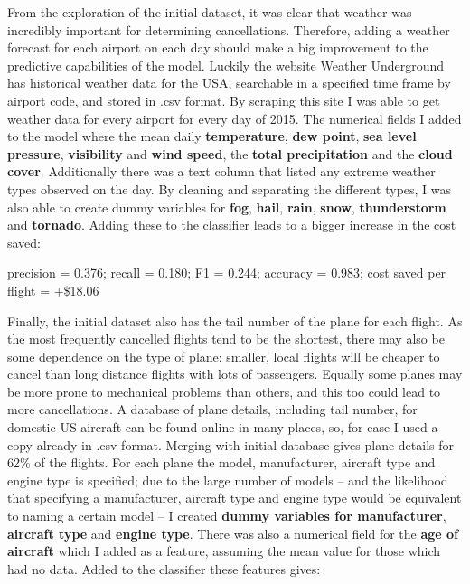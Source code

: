 \documentclass[a4paper]{article}
\begin{document}
From the exploration of the initial dataset, it was clear that weather was incredibly important for determining cancellations. Therefore, adding a weather forecast for each airport on each day should make a big improvement to the predictive capabilities of the model. Luckily the website Weather Underground\footnotemark[17] has historical weather data for the USA, searchable in a specified time frame by airport code, and stored in .csv format. By scraping this site I was able to get weather data for every airport for every day of 2015. The numerical fields I added to the model where the mean daily {\bf temperature}, {\bf dew point}, {\bf sea level pressure}, {\bf visibility} and {\bf wind speed}, the {\bf total precipitation} and the {\bf cloud cover}. Additionally there was a text column that listed any extreme weather types observed on the day. By cleaning and separating the different types, I was also able to create dummy variables for {\bf fog}, {\bf hail}, {\bf rain}, {\bf snow}, {\bf thunderstorm} and {\bf tornado}. Adding these to the classifier leads to a bigger increase in the cost saved:

\noindent precision = 0.376; recall = 0.180; F1 = 0.244; accuracy = 0.983; cost saved per flight = +\$18.06

Finally, the initial dataset also has the tail number of the plane for each flight. As the most frequently cancelled flights tend to be the shortest, there may also be some dependence on the type of plane: smaller, local flights will be cheaper to cancel than long distance flights with lots of passengers. Equally some planes may be more prone to mechanical problems than others, and this too could lead to more cancellations. A database of plane details, including tail number, for domestic US aircraft can be found online in many places, so, for ease I used a copy already in .csv format.\footnotemark[18] Merging with initial database gives plane details for 62\% of the flights. For each plane the model, manufacturer, aircraft type and engine type is specified; due to the large number of models -- and the likelihood that specifying a manufacturer, aircraft type and engine type would be equivalent to naming a certain model -- I created {\bf dummy variables for  manufacturer}, {\bf aircraft type} and {\bf engine type}. There was also a numerical field for the {\bf age of aircraft} which I added as a feature, assuming the mean value for those which had no data. Added to the classifier these features gives:
\end{document}
